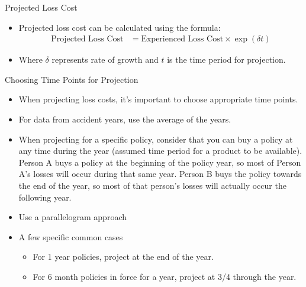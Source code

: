 \documentclass[compress,mathserif]{beamer}
\begin{document}
\begin{frame}{Projected Loss Cost}
    \begin{itemize}
        \item Projected loss cost can be calculated using the formula:
        \begin{align*}
            \text{Projected Loss Cost} &= \text{Experienced Loss Cost} \times \exp(\delta t)
        \end{align*}
        \item Where $\delta$ represents rate of growth and $t$ is the time period for projection.
    \end{itemize}
\end{frame}


\begin{frame}{Choosing Time Points for Projection}
    \begin{itemize}
        \item When projecting loss costs, it's important to choose appropriate time points.
        \item For data from accident years, use the average of the years.
        \item When projecting for a specific policy, consider that you can buy a policy at any time during the year (assumed time period for a product to be available). Person A buys a policy at the beginning of the policy year, so most of Person A's losses will occur during that same year. Person B buys the policy towards the end of the year, so most of that person's losses will actually occur the following year. 
        \item Use a parallelogram approach
        \item A few specific common cases
        \begin{itemize}
            \item For 1 year policies, project at the end of the year.
            \item For 6 month policies in force for a year, project at 3/4 through the year.
        \end{itemize}
    \end{itemize}
\end{frame}
\end{document}
